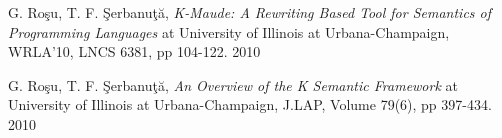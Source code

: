 \documentclass[11pt,a4paper]{article}
\begin{document}
\begin{thebibliography}{9}


 G. Ro\c{s}u, T. F. \c{S}erbanu\c{t}\u{a}, \emph{K-Maude: A Rewriting Based Tool for Semantics of Programming Languages} at University of Illinois at Urbana-Champaign, WRLA'10, LNCS 6381, pp 104-122. 2010

 G. Ro\c{s}u, T. F. \c{S}erbanu\c{t}\u{a}, \emph{An Overview of the K Semantic Framework } at University of Illinois at Urbana-Champaign, J.LAP, Volume 79(6), pp 397-434. 2010


\end{thebibliography}


\newpage
\end{document}
